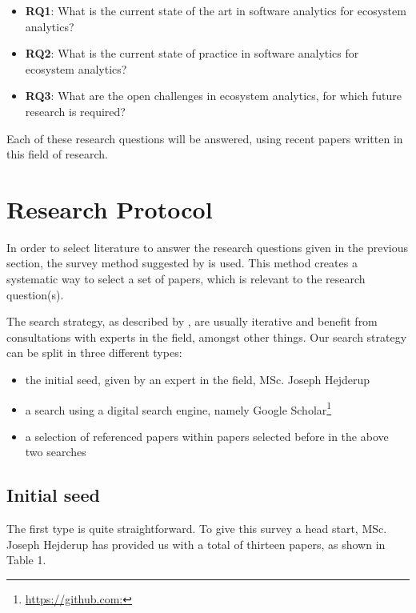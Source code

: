\documentclass[]{book}
\providecommand{\tightlist}{%
  \setlength{\itemsep}{0pt}\setlength{\parskip}{0pt}}
\let\rmarkdownfootnote\footnote%
\def\footnote{\protect\rmarkdownfootnote}
\begin{document}
\begin{itemize}
\tightlist
\item
  \textbf{RQ1}: What is the current state of the art in software
  analytics for ecosystem analytics?
\item
  \textbf{RQ2}: What is the current state of practice in software
  analytics for ecosystem analytics?
\item
  \textbf{RQ3}: What are the open challenges in ecosystem analytics, for
  which future research is required?
\end{itemize}

Each of these research questions will be answered, using recent papers
written in this field of research.

\section{Research Protocol}\label{research-protocol-2}

In order to select literature to answer the research questions given in
the previous section, the survey method suggested by
\citet{Kitchenham2004} is used. This method creates a systematic way to
select a set of papers, which is relevant to the research question(s).

The search strategy, as described by \citet{Kitchenham2004}, are usually
iterative and benefit from consultations with experts in the field,
amongst other things. Our search strategy can be split in three
different types:

\begin{itemize}
\tightlist
\item
  the initial seed, given by an expert in the field, MSc. Joseph
  Hejderup
\item
  a search using a digital search engine, namely Google
  Scholar\footnote{\url{https://github.com:}}
\item
  a selection of referenced papers within papers selected before in the
  above two searches
\end{itemize}

\subsection{Initial seed}\label{initial-seed}

The first type is quite straightforward. To give this survey a head
start, MSc. Joseph Hejderup has provided us with a total of thirteen
papers, as shown in Table 1.
\end{document}
